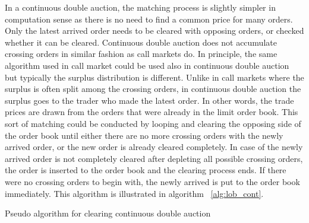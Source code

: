 In a continuous double auction, the matching process is slightly simpler in computation
sense as there is no need to find a common price for many orders. Only the latest arrived
order needs to be cleared with opposing orders, or checked whether it can be cleared. Continuous
double auction does not accumulate crossing orders in similar fashion as call markets do. 
In principle, the same algorithm used in call market could be used also in continuous double auction 
but typically the surplus distribution is different. Unlike in call markets where the surplus is often
split among the crossing orders, in continuous double auction the surplus goes to the trader who made the 
latest order. In other words, the trade prices are drawn from the orders that were already in the limit 
order book. This sort of matching could be conducted by looping and clearing the opposing side of the 
order book until either there are no more crossing orders with the newly arrived order, or the new 
order is already cleared completely. In case of the newly arrived order is not completely cleared after 
depleting all possible crossing orders, the order is inserted to the order book and the clearing process 
ends. If there were no crossing orders to begin with, the newly arrived is put to the order book immediately. 
This algorithm is illustrated in algorithm ~\ref{alg:lob_cont}. 

\begin{algorithm}[H]
    \SetAlgoLined
    \DontPrintSemicolon

    \caption{Pseudo algorithm for clearing continuous double auction}
    \label{alg:lob_cont}
\end{algorithm}


